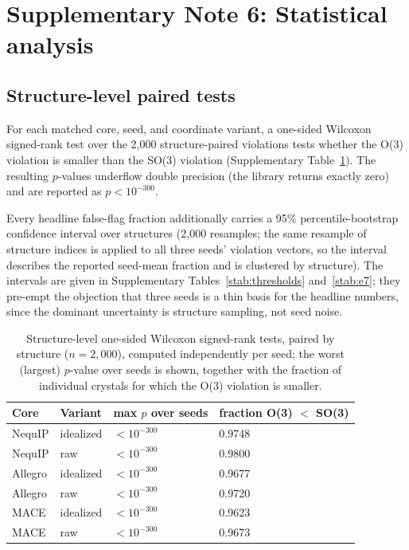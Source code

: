 \section*{Supplementary Note 6: Statistical analysis}

\subsection*{Structure-level paired tests}

For each matched core, seed, and coordinate variant, a one-sided Wilcoxon signed-rank test over the 2,000 structure-paired violations tests whether the O(3) violation is smaller than the SO(3) violation (Supplementary Table~\ref{stab:wilcoxon}). The resulting $p$-values underflow double precision (the library returns exactly zero) and are reported as $p<10^{-300}$.

Every headline false-flag fraction additionally carries a 95\% percentile-bootstrap confidence interval over structures (2,000 resamples; the same resample of structure indices is applied to all three seeds' violation vectors, so the interval describes the reported seed-mean fraction and is clustered by structure). The intervals are given in Supplementary Tables~\ref{stab:thresholds} and~\ref{stab:e7}; they pre-empt the objection that three seeds is a thin basis for the headline numbers, since the dominant uncertainty is structure sampling, not seed noise.

\begin{table}[htbp]
\centering
\caption{Structure-level one-sided Wilcoxon signed-rank tests, paired by structure ($n = 2{,}000$), computed independently per seed; the worst (largest) $p$-value over seeds is shown, together with the fraction of individual crystals for which the O(3) violation is smaller.}
\label{stab:wilcoxon}
\scriptsize
\begin{tabular}{llll}
\toprule
Core & Variant & max $p$ over seeds & fraction O(3) $<$ SO(3) \\
\midrule
NequIP & idealized & $<10^{-300}$ & 0.9748 \\
NequIP & raw & $<10^{-300}$ & 0.9800 \\
Allegro & idealized & $<10^{-300}$ & 0.9677 \\
Allegro & raw & $<10^{-300}$ & 0.9720 \\
MACE & idealized & $<10^{-300}$ & 0.9623 \\
MACE & raw & $<10^{-300}$ & 0.9673 \\
\bottomrule
\end{tabular}
\end{table}

